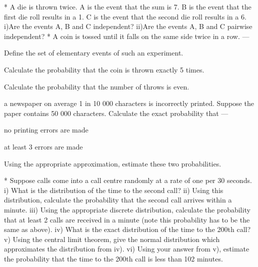 
*  A die is thrown twice. A is the event that the sum is 7. B is the event that the first die roll results in a 1. C is the event that the second die roll results in a 6. 
i)Are the events A, B and C independent?
ii)Are the events A, B and C pairwise independent?
* A coin is tossed until it falls on the same side twice in a row.
--- 
\item[(i)] Define the set of elementary events of such an experiment.
\item[(ii)]  Calculate the probability that the coin is thrown exactly 5 times.
\item[(iii)]  Calculate the probability that the number of throws is even.

\itemIn a newspaper on average 1 in 10 000 characters is incorrectly printed. Suppose the paper contains 50 000 characters. Calculate the exact probability that 
 --- 
\item[(i)]no printing errors are made
\item[(ii)]at least 3 errors are made
 
Using the appropriate approximation, estimate these two probabilities. 




*  Suppose calls come into a call centre randomly at a rate of one per 30 seconds.
i) What is the distribution of the time to the second call?
ii) Using this distribution, calculate the probability that the second call arrives within a minute. 
iii) Using the appropriate discrete distribution, calculate the probability that at least 2 calls are received in a minute (note this probability has to be the same as above).
iv) What is the exact distribution of the time to the 200th call?
v) Using the central limit theorem, give the normal distribution which approximates the distribution from iv).
vi) Using your answer from v), estimate the probability that the time to the 200th call is less than 102 minutes.

